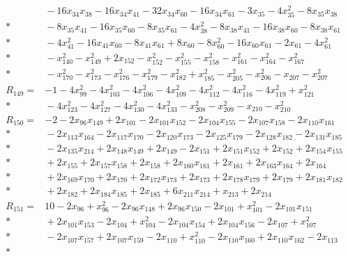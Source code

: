\begin{align*}
&{} - 16x_{34}x_{38} - 16x_{34}x_{41} - 32x_{34}x_{60} - 16x_{34}x_{61} - 3x_{35} - 4x_{35}^{2} - 8x_{35}x_{38} \\*
&{} - 8x_{35}x_{41} - 16x_{35}x_{60} - 8x_{35}x_{61} - 4x_{38}^{2} - 8x_{38}x_{41} - 16x_{38}x_{60} - 8x_{38}x_{61} \\*
&{} - 4x_{41}^{2} - 16x_{41}x_{60} - 8x_{41}x_{61} + 8x_{60} - 8x_{60}^{2} - 16x_{60}x_{61} - 2x_{61} - 4x_{61}^{2} \\*
&{} - x_{140}^{2} - x_{149}^{2} + 2x_{152} - x_{152}^{2} - x_{155}^{2} - x_{158}^{2} - x_{161}^{2} - x_{164}^{2} - x_{167}^{2} \\*
&{} - x_{170}^{2} - x_{173}^{2} - x_{176}^{2} - x_{179}^{2} - x_{182}^{2} + x_{185}^{2} - x_{205}^{2} - x_{206}^{2} - x_{207} - x_{207}^{2} \\[4pt]
R_{149} ={}& -1 - 4x_{99}^{2} - 4x_{103}^{2} - 4x_{106}^{2} - 4x_{109}^{2} - 4x_{112}^{2} - 4x_{116}^{2} - 4x_{119}^{2} + x_{121}^{2} \\*
&{} - 4x_{123}^{2} - 4x_{127}^{2} - 4x_{130}^{2} - 4x_{133}^{2} - x_{208}^{2} - x_{209}^{2} - x_{210} - x_{210}^{2} \\[4pt]
R_{150} ={}& -2 - 2x_{96}x_{149} + 2x_{101} - 2x_{101}x_{152} - 2x_{104}x_{155} - 2x_{107}x_{158} - 2x_{110}x_{161} \\*
&{} - 2x_{113}x_{164} - 2x_{117}x_{170} - 2x_{120}x_{173} - 2x_{125}x_{179} - 2x_{128}x_{182} - 2x_{131}x_{185} \\*
&{} - 2x_{135}x_{214} + 2x_{148}x_{149} + 2x_{149} - 2x_{151} + 2x_{151}x_{152} + 2x_{152} + 2x_{154}x_{155} \\*
&{} + 2x_{155} + 2x_{157}x_{158} + 2x_{158} + 2x_{160}x_{161} + 2x_{161} + 2x_{163}x_{164} + 2x_{164} \\*
&{} + 2x_{169}x_{170} + 2x_{170} + 2x_{172}x_{173} + 2x_{173} + 2x_{178}x_{179} + 2x_{179} + 2x_{181}x_{182} \\*
&{} + 2x_{182} + 2x_{184}x_{185} + 2x_{185} + 6x_{211}x_{214} + x_{213} + 2x_{214} \\[4pt]
R_{151} ={}& 10 - 2x_{96} + x_{96}^{2} - 2x_{96}x_{148} + 2x_{96}x_{150} - 2x_{101} + x_{101}^{2} - 2x_{101}x_{151} \\*
&{} + 2x_{101}x_{153} - 2x_{104} + x_{104}^{2} - 2x_{104}x_{154} + 2x_{104}x_{156} - 2x_{107} + x_{107}^{2} \\*
&{} - 2x_{107}x_{157} + 2x_{107}x_{159} - 2x_{110} + x_{110}^{2} - 2x_{110}x_{160} + 2x_{110}x_{162} - 2x_{113} \\*

\end{align*}
